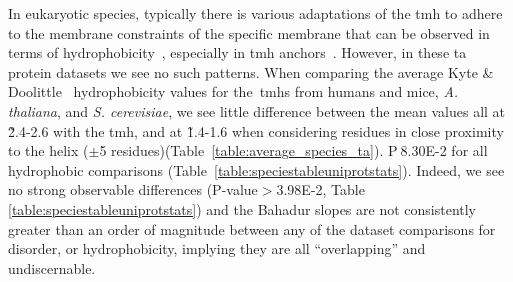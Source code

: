 In eukaryotic species, typically there is various adaptations of the \gls{tmh} to adhere to the membrane constraints of the specific membrane that can be observed in terms of hydrophobicity~\cite{Sharpe2010}, especially in \gls{tmh} anchors~\cite{Baker2017}.
However, in these \gls{ta} protein datasets we see no such patterns.
When comparing the average Kyte \& Doolittle~\cite{Kyte1982} hydrophobicity values for the~\gls{tmh}s from humans and mice, \textit{A. thaliana}, and  \textit{S. cerevisiae}, we see little difference between the mean values all at \~2.4-2.6 with the \gls{tmh}, and at \~1.4-1.6 when considering residues in close proximity to the helix ($\pm$5 residues)(Table~\ref{table:average_species_ta}).
P$\>$8.30E-2 for all hydrophobic comparisons (Table~\ref{table:speciestableuniprotstats}).
Indeed, we see no strong observable differences (P-value$>$3.98E-2, Table \ref{table:speciestableuniprotstats}) and the Bahadur slopes are not consistently greater than an order of magnitude between any of the dataset comparisons for disorder, or hydrophobicity, implying they are all ``overlapping'' and undiscernable.


